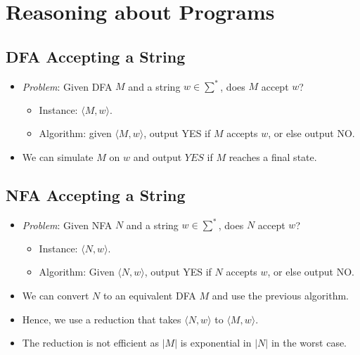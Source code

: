 \section{Reasoning about Programs}

\subsection{DFA Accepting a String}
\begin{itemize}
    \item \textit{Problem}: Given DFA $M$ and a string $w \in \sum^\ast$, does $M$ accept $w$?
    \begin{itemize}
        \item Instance: $\langle M, w \rangle$.
        \item Algorithm: given $\langle M, w \rangle$, output YES if $M$ accepts $w$, or else output NO.
    \end{itemize}
    \item We can simulate $M$ on $w$ and output $YES$ if $M$ reaches a final state.
\end{itemize}

\subsection{NFA Accepting a String}
\begin{itemize}
    \item \textit{Problem}: Given NFA $N$ and a string $w \in \sum^\ast$, does $N$ accept $w$?
    \begin{itemize}
        \item Instance: $\langle N, w \rangle$.
        \item Algorithm: Given $\langle N, w \rangle$, output YES if $N$ accepts $w$, or else output NO.
    \end{itemize}
    \item We can convert $N$ to an equivalent DFA $M$ and use the previous algorithm.
    \item Hence, we use a reduction that takes $\langle N, w \rangle$ to $\langle M, w \rangle$.
    \item The reduction is not efficient as $\left| M \right|$ is exponential in $\left| N \right|$ in the worst case.
\end{itemize}

